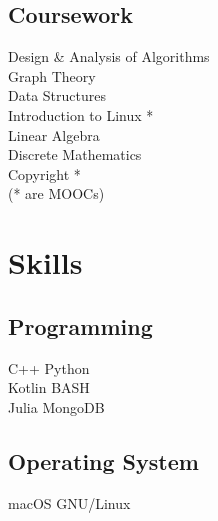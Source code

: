 \documentclass[]{deedy-resume-openfont}
\begin{document}
\begin{minipage}[t]{0.33\textwidth}


\subsection{Coursework}
Design \& Analysis of Algorithms \\
Graph Theory \\
Data Structures \\
Introduction to Linux {*}\\
Linear Algebra \\
Discrete Mathematics \\
Copyright {*}
\\
({*} are MOOCs)
\sectionsep


\section{Skills}
\subsection{Programming}
\textbullet{} C++ \textbullet{} Python \\
\textbullet{} Kotlin \textbullet{} BASH \\
\textbullet{} Julia \textbullet{} MongoDB \\
\subsection{Operating System}
\textbullet{} macOS \textbullet{} GNU/Linux

\end{minipage}
\end{document}
